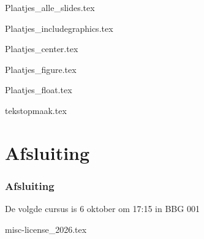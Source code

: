 \documentclass[allauthors,dutch]{../../../cursuspresentatie3}
\def\importslidei#1#2{%
	{#2}
}
\def\importslidej#1#2{%
	{#2}
}
\begin{document}
\importslidei{2026-eerstejaars_cursus_1}{Plaatjes_alle_slides.tex}
\importslidei{2026-eerstejaars_cursus_1}{Plaatjes_includegraphics.tex}
\importslidei{2026-eerstejaars_cursus_1}{Plaatjes_center.tex}
\importslidei{2026-eerstejaars_cursus_1}{Plaatjes_figure.tex}
\importslidei{2026-eerstejaars_cursus_1}{Plaatjes_float.tex}

\importslidej{2026-2027}{tekstopmaak.tex}



\section{Afsluiting}
\begin{frame}
	\frametitle{Afsluiting}
	
	De volgde cursus is 6 oktober om 17:15 in BBG 001
\end{frame}
	
{misc-license_2026.tex}
\end{document}

